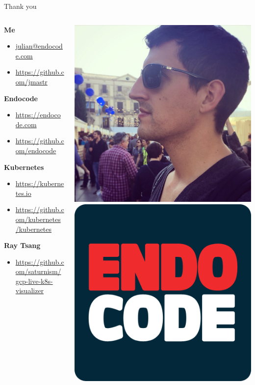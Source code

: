 \begin{frame} %
\centering\LARGE
Thank you
\end{frame}

\begin{frame} %
\begin{columns}[c] %
\begin{column}{.65\textwidth}
{\color{white}\Large
\textbf{Me}}
\begin{itemize}
\tightlist
\item
  \url{julian@endocode.com}
\item
  \url{https://github.com/jmastr}
\end{itemize}
{\color{white}\Large
\textbf{Endocode}}
\begin{itemize}
\tightlist
\item
  \url{https://endocode.com}
\item
  \url{https://github.com/endocode}
\end{itemize}
{\color{white}\Large
\textbf{Kubernetes}}
\begin{itemize}
\tightlist
\item
  \url{https://kubernetes.io}
\item
  \url{https://github.com/kubernetes/kubernetes}
\end{itemize}
{\color{white}\Large
\textbf{Ray Tsang}}
\begin{itemize}
\tightlist
\item
  \url{https://github.com/saturnism/gcp-live-k8s-visualizer}
\end{itemize}
\end{column}
\hfill
\begin{column}{.35\textwidth}
\includegraphics[width=.5\textwidth]{author.jpg}\\
\includegraphics[width=.5\textwidth]{endocode.png}\\

\end{column}
\end{columns}
\end{frame}
